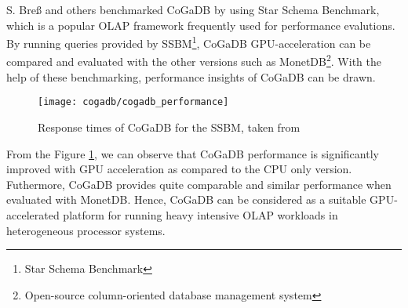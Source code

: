 S. Bre{\ss} and others benchmarked CoGaDB by using Star Schema Benchmark\cite{ssbm}, which is a popular OLAP framework frequently used for performance evalutions. By running queries provided by SSBM\footnote{Star Schema Benchmark}, CoGaDB GPU-acceleration can be compared and evaluated with the other versions such as MonetDB\footnote{Open-source column-oriented database management system}. With the help of these benchmarking, performance insights of CoGaDB can be drawn.
\begin{figure}[h]
\centering
\texttt{[image: cogadb/cogadb\_performance]}
\caption{Response times of CoGaDB for the SSBM, taken from \cite{cogadb_design_impl}}
\label{fig:cogadbperformance}
\end{figure}
\newline 
From the Figure \ref{fig:cogadbperformance}, we can observe that CoGaDB performance is significantly improved with GPU acceleration as compared to the CPU only version. Futhermore, CoGaDB provides quite comparable and similar performance when evaluated with MonetDB. Hence, CoGaDB can be considered as a suitable GPU-accelerated platform for running heavy intensive OLAP workloads in heterogeneous processor systems.